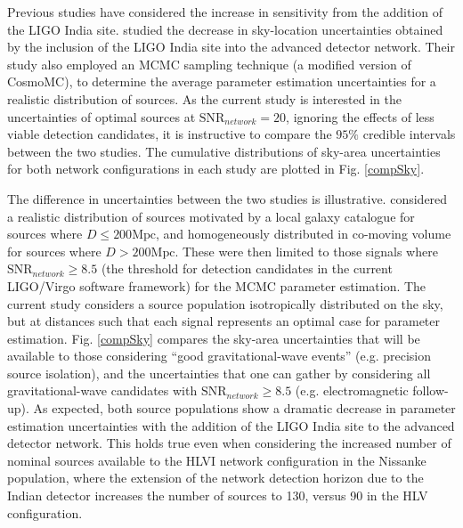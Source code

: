 \documentclass[11pt,a4paper]{emulateapj} 
\begin{document}
Previous studies have considered the increase in sensitivity from the addition of the 
LIGO India site.  \cite{Nissanke2013} studied the decrease in
sky-location uncertainties obtained by the inclusion of the LIGO India site
into the advanced detector network.  Their study also employed an MCMC sampling technique 
 (a modified version of CosmoMC),
to determine the average parameter estimation uncertainties for a realistic distribution
of sources.  As the current study is interested in the uncertainties
of optimal sources at $\text{SNR}_{network}=20$, ignoring the effects of less viable 
detection candidates, it is instructive to compare the $95\%$ credible intervals
between the two studies.  The cumulative distributions of sky-area uncertainties
for both network configurations in each study are plotted in Fig. \ref{compSky}.

The difference in uncertainties between the two studies is illustrative.  \cite{Nissanke2013}
considered a realistic distribution of sources motivated by a local galaxy catalogue for
 sources where $D\leq 200\text{Mpc}$, and homogeneously distributed in co-moving
 volume for sources where $D > 200\text{Mpc}$.  These were then limited to those signals
 where $\text{SNR}_{network} \geq 8.5$ (the threshold for detection candidates in the
 current LIGO/Virgo software framework) for the MCMC parameter estimation.
   The current study considers a source
 population isotropically distributed on the sky, but at distances such that each signal
 represents an optimal case for parameter estimation.   Fig. \ref{compSky} compares
 the sky-area uncertainties that will be available to those considering ``good 
 gravitational-wave events'' (e.g. precision source isolation), and the 
 uncertainties that one can gather by considering all gravitational-wave candidates with 
 $\text{SNR}_{network}\geq 8.5$ (e.g. electromagnetic follow-up).  As expected, both source
 populations show a dramatic decrease in parameter estimation uncertainties with the
 addition of the LIGO India site to the advanced detector network.  This holds true even when
 considering the increased number of nominal sources available to the HLVI network 
 configuration in the Nissanke population, where the extension of the network detection 
 horizon due to the Indian detector increases the number of sources to 130, versus 90 in 
 the HLV configuration.  
\end{document}
